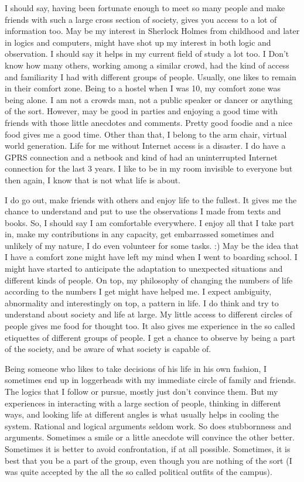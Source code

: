 I should say, having been fortunate enough to meet so many people and make friends with such a 
large cross section of society, gives you access to a lot of information too. May be my interest
in Sherlock Holmes from childhood and later in logics and computers, might have shot up my interest 
in both logic and observation. I should say it helps in my current field of study a lot too. I Don't 
know how many others, working among a similar crowd, had the kind of access and familiarity I had with
different groups of people. Usually, one likes to remain in their comfort zone. Being to a hostel 
when I was 10, my comfort zone was being alone. I am not a crowds man, not a public speaker or dancer 
or anything of the sort. However, may be good in parties and enjoying a good time with friends with those little anecdotes
and comments. Pretty good foodie and a nice food gives me a good time. Other than that, I belong to 
the arm chair, virtual world generation. Life for me without Internet access is a disaster. I do have
a GPRS connection and a netbook and kind of had an uninterrupted Internet connection for the last 3 years. I like to 
be in my room invisible to everyone but then again, I know that is not what life is about. 

I do go out, make friends with others and enjoy life to the fullest. It gives me the chance to understand 
and put to use the observations I made from texts and books. So, I should say I am comfortable
everywhere. I enjoy all that I take part in, make my contributions in any capacity, get embarrassed
sometimes and unlikely of my nature, I do even volunteer for some tasks. :) May be the idea that I
have a comfort zone might have left my mind when I went to boarding school. I might have started to anticipate the adaptation to 
unexpected situations and different kinds of people. On top, 
my philosophy of changing the numbers of life according to the numbers I get might have helped me. I 
expect ambiguity, abnormality and interestingly on top, a pattern in life. I do think and try to
understand about society and life at large. My little access to different circles of people gives 
me food for thought too. It also gives me experience in the so called etiquettes of different 
groups of people. I get a chance to observe by being a part of the society, and be aware of what society 
is capable of. 

Being someone who likes to take decisions of his life in his own fashion, I sometimes end up in
loggerheads with my immediate circle of family and friends. The logics that I follow or pursue, mostly 
just don't convince them. But my experiences in interacting with a large section of people, thinking 
in different ways, and looking life at different angles is what usually helps in cooling the system.
Rational and logical arguments seldom work. So does stubbornness and arguments. Sometimes a smile or 
a little anecdote will convince the other better. Sometimes it is better to avoid confrontation, if at 
all possible. Sometimes, it is best that you be a part of the group, even though you are nothing of the 
sort (I was quite accepted by the all the so called political outfits of the campus). 

